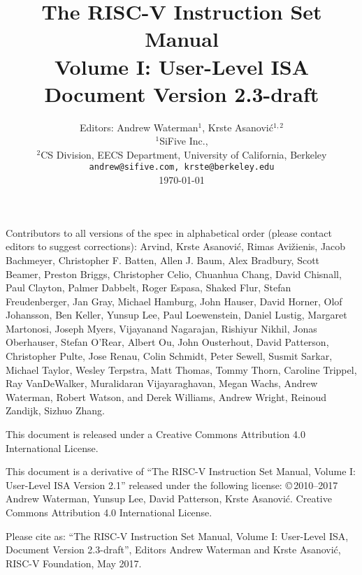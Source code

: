 \documentclass[twoside,11pt]{book}
\newcommand{\specrev}{2.3-draft}
\begin{document}
\title{\vspace{-0.7in}\Large {\bf The RISC-V Instruction Set Manual} \\
  \large {\bf Volume I: User-Level ISA} \\
  Document Version \specrev
  \vspace{-0.1in}}

\author{Editors: Andrew Waterman$^{1}$, Krste Asanovi\'{c}$^{1,2}$ \\
  $^{1}$SiFive Inc., \\
  $^{2}$CS Division, EECS Department, University of California, Berkeley \\
  {\tt andrew@sifive.com, krste@berkeley.edu} \\
  \today
}
\date{} 
\maketitle

Contributors to all versions of the spec in
alphabetical order (please contact editors to suggest
corrections):
Arvind, Krste Asanovi\'{c}, Rimas Avi\v{z}ienis, Jacob Bachmeyer, Christopher
F. Batten, Allen J. Baum, Alex Bradbury, Scott Beamer, Preston Briggs,
Christopher Celio, Chuanhua Chang, David Chisnall, Paul Clayton, Palmer
Dabbelt, Roger Espasa, Shaked Flur, Stefan Freudenberger, Jan Gray, Michael
Hamburg, John Hauser, David Horner, Olof Johansson, Ben Keller, Yunsup Lee,
Paul Loewenstein, Daniel Lustig, Margaret Martonosi, Joseph Myers, Vijayanand
Nagarajan, Rishiyur Nikhil, Jonas Oberhauser, Stefan O'Rear, Albert Ou, John
Ousterhout, David Patterson, Christopher Pulte, Jose Renau, Colin Schmidt,
Peter Sewell, Susmit Sarkar, Michael Taylor, Wesley Terpstra, Matt Thomas,
Tommy Thorn, Caroline Trippel, Ray VanDeWalker, Muralidaran Vijayaraghavan,
Megan Wachs, Andrew Waterman, Robert Watson, and Derek Williams, Andrew Wright,
Reinoud Zandijk, Sizhuo Zhang.

This document is released under a Creative Commons Attribution 4.0
International License.

This document is a derivative of ``The RISC-V Instruction Set
Manual, Volume I: User-Level ISA Version 2.1'' released under the following license:
\copyright \,2010--2017 Andrew Waterman, Yunsup Lee, David Patterson, Krste Asanovi\'{c}. 
Creative Commons Attribution 4.0 International License.

Please cite as: ``The RISC-V Instruction Set
Manual, Volume I: User-Level ISA, Document Version \specrev'', Editors
Andrew Waterman and Krste Asanovi\'{c}, RISC-V Foundation, May 2017.
\end{document}
